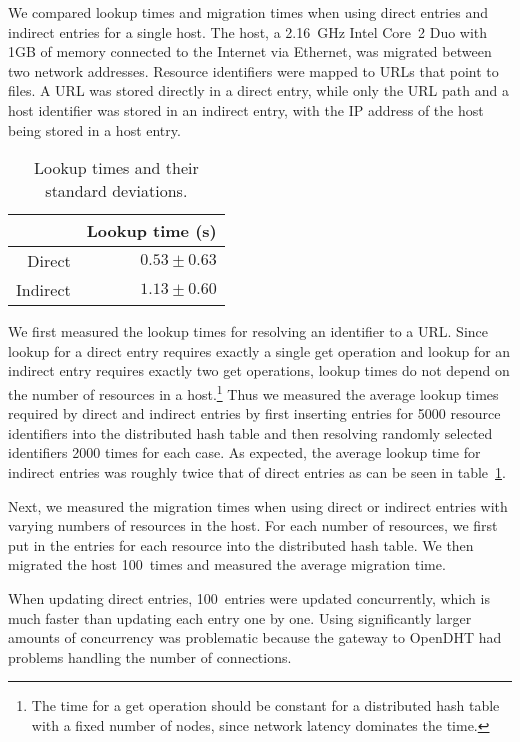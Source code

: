 \documentclass{article}
\begin{document}
We compared lookup times and migration times when using direct entries
and indirect entries for a single host.  The host, a 2.16~GHz Intel
Core~2 Duo with 1GB of memory connected to the Internet via Ethernet,
was migrated between two network addresses.  Resource identifiers were
mapped to URLs that point to files.  A URL was stored directly in a
direct entry, while only the URL path and a host identifier was stored
in an indirect entry, with the IP address of the host being stored in
a host entry.

\begin{table}
  \centering
  \begin{tabular}{r|r}
    & Lookup time (s) \\ \hline
    Direct & $0.53 \pm 0.63$ \\
    Indirect & $1.13 \pm 0.60$
  \end{tabular}
  \caption{Lookup times and their standard deviations.}
  \label{tab:lookup}
\end{table}

We first measured the lookup times for resolving an identifier to a
URL.  Since lookup for a direct entry requires exactly a single get
operation and lookup for an indirect entry requires exactly two get
operations, lookup times do not depend on the number of resources in a
host.\footnote{The time for a get operation should be constant for a
  distributed hash table with a fixed number of nodes, since network
  latency dominates the time.}  Thus we measured the average lookup
times required by direct and indirect entries by first inserting
entries for 5000 resource identifiers into the distributed hash table
and then resolving randomly selected identifiers 2000 times for each
case.  As expected, the average lookup time for indirect entries was
roughly twice that of direct entries as can be seen in
table~\ref{tab:lookup}.

Next, we measured the migration times when using direct or indirect
entries with varying numbers of resources in the host.  For each
number of resources, we first put in the entries for each resource
into the distributed hash table.  We then migrated the host 100~times
and measured the average migration time.

When updating direct entries, 100~entries were updated concurrently,
which is much faster than updating each entry one by one.  Using
significantly larger amounts of concurrency was problematic because
the gateway to OpenDHT had problems handling the number of
connections.
\end{document}
